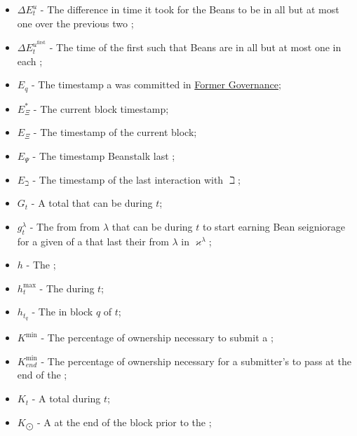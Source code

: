 \documentclass[class=article, crop=false]{standalone}
\begin{document}
\begin{itemize}[topsep=0pt, itemsep=3pt,leftmargin=16pt]
    \item[] $\Delta E_{t}^{u}$ - \hypertarget{ht56}{The difference in time it took for the Beans to be  in all but at most one  over the previous two };
    \item[] $\Delta E_{t}^{u^{\text{first}}}$ - \hypertarget{ht57}{The time of the first  such that Beans are  in all but at most one  in each };
    \item[] $E_q$ - \hypertarget{ht77}{The timestamp a  was committed in \hyperlink{subsection.14.3}{Former Governance}};
    \item[] $E_{\Xi}^*$ - \hypertarget{ht73}{The current block timestamp};
    \item[] $E_\Xi$ - The timestamp of the current block;
    \item[] $E_{\Psi}$ - \hypertarget{ht78}{The timestamp Beanstalk last };
    \item[] $E_{\beth}$ - \hypertarget{ht72}{The timestamp of the last interaction with $\beth$};
    \item[] $G_t$ - \hypertarget{ht100}{A  total  that can be  during $t$};
    \item[] $g_{t}^{\lambda}$ - \hypertarget{ht101}{The  from  from \hyperlink{ht126}{$\lambda$}  that can be  during $t$ to start earning Bean seigniorage for a given  of a  that last  their  from \hyperlink{ht126}{$\lambda$}  in $\varkappa^{\lambda}$};
    \item[] $h$ - \hypertarget{ht110}{The };
    \item[] $h_t^{\text{max}}$ - The  during $t$;
    \item[] $h_{t_q}$ - The  in block $q$ of $t$;
    \item[] $K^{\text{min}}$ - \hypertarget{ht119}{The percentage of  ownership necessary to submit a };
    \item[] $K_{end}^{\text{min}}$ - The percentage of  ownership necessary for a submitter's  to pass at the end of the ;
    \item[] $K_t$ - \hypertarget{ht118}{A  total  during $t$};
    \item[] $K_{\bigodot}$ - \hypertarget{ht116}{A   at the end of the block prior to the };

\end{itemize}
\end{document}
